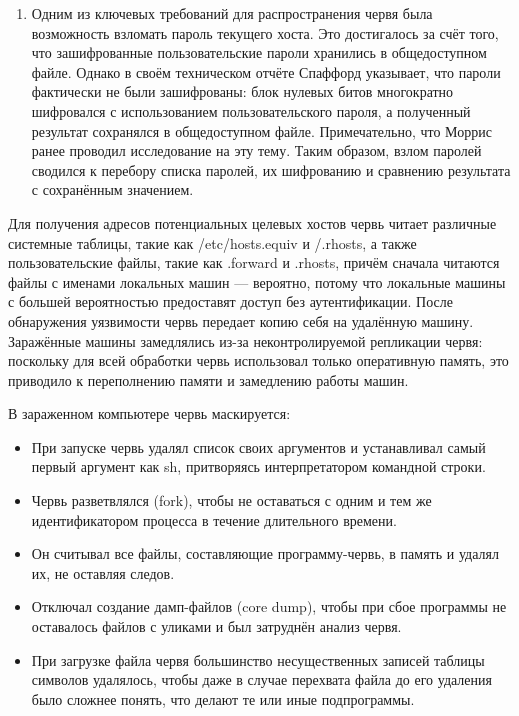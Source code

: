\documentclass[
  english,
  russian,
  12pt,
  a4paper,
]{phdthesr}
\begin{document}
\begin{enumerate}
  который локально запускает червя. Использование rexec было сложнее:
  для проникновения червь использовал локальный пароль для удалённого
  входа в систему. Для этого червю сначала нужно было взломать локальный
  пароль. Отдельно рассмотрим процедуру взлома паролей.
\item
  Одним из ключевых требований для распространения червя была
  возможность взломать пароль текущего хоста. Это достигалось за счёт
  того, что зашифрованные пользовательские пароли хранились в
  общедоступном файле. Однако в своём техническом отчёте Спаффорд
  указывает, что пароли фактически не были зашифрованы: блок нулевых
  битов многократно шифровался с использованием пользовательского
  пароля, а полученный результат сохранялся в общедоступном файле.
  Примечательно, что Моррис ранее проводил исследование на эту тему.
  Таким образом, взлом паролей сводился к перебору списка паролей, их
  шифрованию и сравнению результата с сохранённым значением.
\end{enumerate}

Для получения адресов потенциальных целевых хостов червь читает
различные системные таблицы, такие как /etc/hosts.equiv и /.rhosts, а
также пользовательские файлы, такие как .forward и .rhosts, причём
сначала читаются файлы с именами локальных машин --- вероятно, потому
что локальные машины с большей вероятностью предоставят доступ без
аутентификации. После обнаружения уязвимости червь передает копию себя
на удалённую машину. Заражённые машины замедлялись из-за
неконтролируемой репликации червя: поскольку для всей обработки червь
использовал только оперативную память, это приводило к переполнению
памяти и замедлению работы машин.

В зараженном компьютере червь маскируется:

\begin{itemize}
\item
  При запуске червь удалял список своих аргументов и устанавливал самый
  первый аргумент как sh, притворяясь интерпретатором командной строки.
\item
  Червь разветвлялся (fork), чтобы не оставаться с одним и тем же
  идентификатором процесса в течение длительного времени.
\item
  Он считывал все файлы, составляющие программу-червь, в память и удалял
  их, не оставляя следов.
\item
  Отключал создание дамп-файлов (core dump), чтобы при сбое программы не
  оставалось файлов с уликами и был затруднён анализ червя.
\item
  При загрузке файла червя большинство несущественных записей таблицы
  символов удалялось, чтобы даже в случае перехвата файла до его
  удаления было сложнее понять, что делают те или иные подпрограммы.
\end{itemize}
\end{document}
